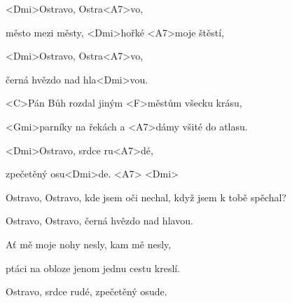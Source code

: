 

\zs
<Dmi>Ostravo, Ostra<A7>vo,

město mezi městy, <Dmi>hořké <A7>moje štěstí,

<Dmi>Ostravo, Ostra<A7>vo,

černá hvězdo nad hla<Dmi>vou.
\ks

\zr
<C>Pán Bůh rozdal jiným <F>městům všecku krásu,

<Gmi>parníky na řekách a <A7>dámy všité do atlasu.

<Dmi>Ostravo, srdce ru<A7>dé,

zpečetěný osu<Dmi>de. <A7> <Dmi>
\kr

\zs
Ostravo, Ostravo, kde jsem oči nechal, když jsem k tobě spěchal?

Ostravo, Ostravo, černá hvězdo nad hlavou.
\ks

\zr
Ať mě moje nohy nesly, kam mě nesly,

ptáci na obloze jenom jednu cestu kreslí.

Ostravo, srdce rudé, zpečetěný osude.
\kr

\kp
